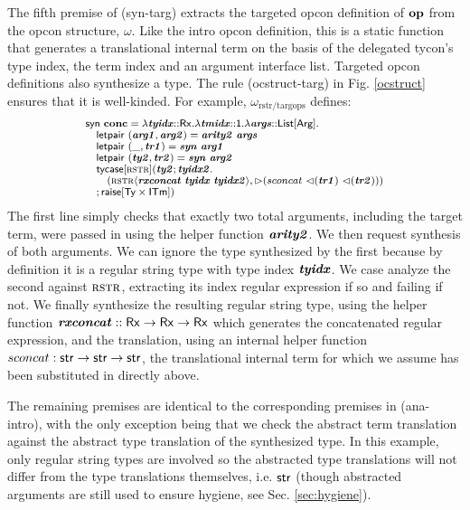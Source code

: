 \documentclass[10pt,preprint]{sigplanconf}
\begin{document}
The fifth premise of (syn-targ) extracts the targeted opcon definition of $\textbf{op}$ from the opcon structure, $\omega$. Like the intro opcon definition, this is a static function that generates a translational internal term on the basis of the delegated tycon's type index, the term index and an argument interface list. Targeted opcon definitions also synthesize a type. The rule (ocstruct-targ) in Fig. \ref{ocstruct} ensures that it is well-kinded. 
For example, $\omega_\text{rstr/targops}$ defines:
\vspace{-3px}
\[\small
\begin{array}{l}
\keyw{syn}~\opname{conc}=\slam{\krx}{\svar{tyidx}}{
    \slam{\kunit}{\svar{tmidx}}{
        \slam{\kargs}{\svar{args}}{\\
            \quad \keyw{letpair}~(\svar{arg1}, \svar{arg2}) = \svar{arity2}~\svar{args}\\
            \quad \keyw{letpair}~(\_, \svar{tr1}) = \svar{syn}~\svar{arg1}\\
            \quad \keyw{letpair}~(\svar{ty2}, \svar{tr2}) = \svar{syn}~\svar{arg2}\\
            \quad \stycase{\tcvar{rstr}}{\svar{ty2}}{\svar{tyidx2}}{\\
                \quad\quad (\sty{\tcvar{rstr}}{\svar{rxconcat}~\svar{tyidx}~\svar{tyidx2}}, \sqitm{sconcat~\quq{\svar{tr1}}~\quq{\svar{tr2}}})\\
                \quad
            }{\sraise{\kty\times\kitm}}
        }
    }
}
\end{array}
\]\vspace{-3px}
The first line simply checks that exactly two total arguments, including the target term, were passed in using the helper function ${\textbf{\textit{arity2}}}$. We then request synthesis of both arguments. We can ignore the type synthesized by the first because by definition it is a regular string type with type index ${\textbf{\textit{tyidx}}}$. We case analyze the second against $\textsc{rstr}$, extracting its index regular expression if so and failing if not. We finally synthesize the resulting regular string type, using the helper function ${\textbf{\textit{rxconcat}}} :: {\sf Rx} \rightarrow {\sf Rx} \rightarrow {\sf Rx}$ which generates the concatenated regular expression, and the translation, using an internal helper function $sconcat : {\sf str} \rightarrow {\sf str} \rightarrow {\sf str}$, the translational internal term for which we assume has been substituted in directly above.

The remaining premises are identical to the corresponding premises in (ana-intro), with the only exception being that we check the abstract term translation against the abstract type translation of the synthesized type. In this example, only regular string types are involved so the abstracted type translations will not differ from the type translations themselves, i.e. ${\sf str}$ (though abstracted arguments are still used to ensure hygiene, see Sec. \ref{sec:hygiene}). 
\end{document}
